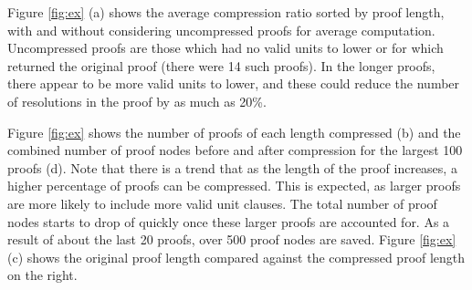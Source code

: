 
Figure \ref{fig:ex} (a) shows the average compression ratio sorted by proof length, with and without considering uncompressed proofs for average computation. Uncompressed proofs are those which had no valid units to lower or for which \SFOLowerUnits returned the original proof (there were 14 such proofs). In the longer proofs, there appear to be more valid units to lower, and these could reduce the number of resolutions in the proof by as much as 20\%.

Figure \ref{fig:ex} shows the number of proofs of each length compressed (b) and the combined number of proof nodes before and after compression for the largest 100 proofs (d). Note that there is a trend that as the length of the proof increases, a higher percentage of proofs can be compressed. This is expected, as larger proofs are more likely to include more valid unit clauses. The total number of proof nodes starts to drop of quickly once these larger proofs are accounted for. As a result of about the last 20 proofs, over 500 proof nodes are saved. Figure \ref{fig:ex} (c) shows the original proof length compared against the compressed proof length on the right.







